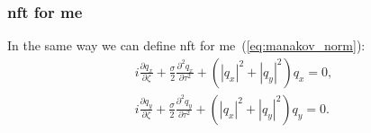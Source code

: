 

\subsubsection{\acrshort{nft} for \acrlong{me}}

In the same way we can define \acrlong{nft} for \acrlong{me}~(\ref{eq:manakov_norm}):
\begin{gather} 
i \frac{\partial q_x}{\partial \zeta} + \frac{\sigma}{2}\frac{\partial^2 q_x}{\partial \tau^2} +  \left(|q_x|^2 + |q_y|^2\right) q_x = 0, \nonumber \\
i \frac{\partial q_y}{\partial \zeta} + \frac{\sigma}{2}\frac{\partial^2 q_y}{\partial \tau^2} + \left(|q_x|^2 + |q_y|^2\right) q_y = 0.
\label{eq:manakov_norm_again}
\end{gather}

